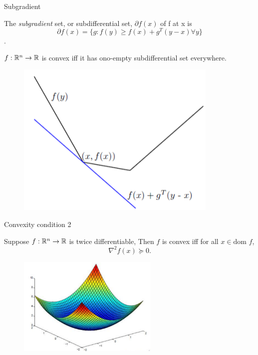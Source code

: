 \documentclass[draft]{beamer}
\begin{document}
\begin{frame}{Subgradient}
	\begin{define}
		The \textit{subgradient} set, or subdifferential set, $\partial f(x)$ of f at x is $$\partial f(x) = \{ g: f(y) \ge f(x) +g^T(y-x) \forall y\}$$. 
	\end{define}
	
	\begin{minipage}{\textwidth}
		\begin{minipage}{.47\textwidth}
			\begin{thm}
				$f:{\mathbb{R}}^n\rightarrow {\mathbb{R}}$ is convex iff it has ono-empty subdifferential set everywhere. 
			\end{thm}
		\end{minipage}
		\hfill
		\begin{minipage}{.47\textwidth}
			\begin{figure}
				\includegraphics[width=\textwidth]{2018-03-04-22-37-40.png} 
			\end{figure}
		\end{minipage}
	\end{minipage}
\end{frame} 
\begin{frame}{Convexity condition 2} 
	\begin{thm}
		Suppose $f: {\mathbb{R}}^{n} \rightarrow {\mathbb{R}} $ is twice differentiable, Then $f$ is convex iff for all $x \in \text{dom } f $, \[\nabla^2f(x) \succeq 0. \]
	\end{thm}
	\begin{figure}
	\includegraphics[width=0.6\textwidth]{2018-03-05-10-37-24.png} 
	\end{figure}
\end{frame}
\end{document}
